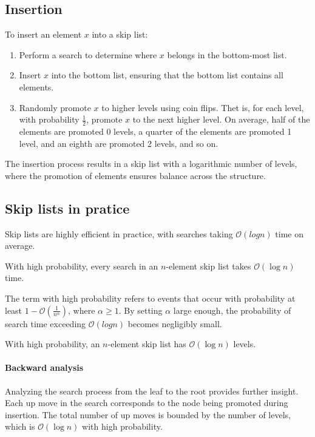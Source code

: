 \subsection{Insertion}
To insert an element $x$ into a skip list:
\begin{enumerate}
    \item Perform a search to determine where $x$ belongs in the bottom-most list.
    \item Insert $x$ into the bottom list, ensuring that the bottom list contains all elements.
    \item Randomly promote $x$ to higher levels using coin flips. 
        Thet is, for each level, with probability $\frac{1}{2}$, promote $x$ to the next higher level.
        On average, half of the elements are promoted 0 levels, a quarter of the elements are promoted 1 level, and an eighth are promoted 2 levels, and so on.
\end{enumerate}
The insertion process results in a skip list with a logarithmic number of levels, where the promotion of elements ensures balance across the structure.

\subsection{Skip lists in pratice}
Skip lists are highly efficient in practice, with searches taking $\mathcal{O}(logn)$ time on average.
\begin{theorem}
    With high probability, every search in an $n$-element skip list takes $\mathcal{O}(\log n)$ time. 
\end{theorem}
The term with high probability refers to events that occur with probability at least $1-\mathcal{O}\left(\frac{1}{n^\alpha}\right)$, where $\alpha\geq 1$. 
By setting $\alpha$ large enough, the probability of search time exceeding $\mathcal{O}(logn)$ becomes negligibly small.
\begin{lemma}
    With high probability, an $n$-element skip list has $\mathcal{O}(\log n)$ levels.
\end{lemma}

\paragraph*{Backward analysis}
Analyzing the search process from the leaf to the root provides further insight.
Each up move in the search corresponds to the node being promoted during insertion.
The total number of up moves is bounded by the number of levels, which is $\mathcal{O}(\log n)$ with high probability. 